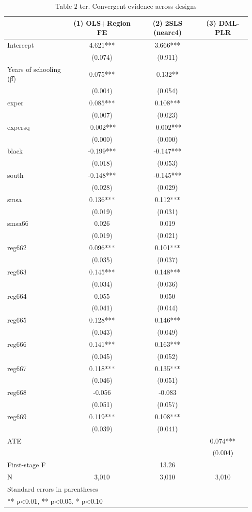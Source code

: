 \begin{table}[htbp]
\centering
\caption{Table 2-ter. Convergent evidence across designs}
\begin{tabular}{lccc}
\hline\hline
 & (1) OLS+Region FE & (2) 2SLS (nearc4) & (3) DML-PLR \\
\hline
Intercept & 4.621*** & 3.666*** &  \\
 & (0.074) & (0.911) &  \\
Years of schooling (β̂) & 0.075*** & 0.132** &  \\
 & (0.004) & (0.054) &  \\
exper & 0.085*** & 0.108*** &  \\
 & (0.007) & (0.023) &  \\
expersq & -0.002*** & -0.002*** &  \\
 & (0.000) & (0.000) &  \\
black & -0.199*** & -0.147*** &  \\
 & (0.018) & (0.053) &  \\
south & -0.148*** & -0.145*** &  \\
 & (0.028) & (0.029) &  \\
smsa & 0.136*** & 0.112*** &  \\
 & (0.019) & (0.031) &  \\
smsa66 & 0.026 & 0.019 &  \\
 & (0.019) & (0.021) &  \\
reg662 & 0.096*** & 0.101*** &  \\
 & (0.035) & (0.037) &  \\
reg663 & 0.145*** & 0.148*** &  \\
 & (0.034) & (0.036) &  \\
reg664 & 0.055 & 0.050 &  \\
 & (0.041) & (0.044) &  \\
reg665 & 0.128*** & 0.146*** &  \\
 & (0.043) & (0.049) &  \\
reg666 & 0.141*** & 0.163*** &  \\
 & (0.045) & (0.052) &  \\
reg667 & 0.118*** & 0.135*** &  \\
 & (0.046) & (0.051) &  \\
reg668 & -0.056 & -0.083 &  \\
 & (0.051) & (0.057) &  \\
reg669 & 0.119*** & 0.108*** &  \\
 & (0.039) & (0.041) &  \\
ATE &  &  & 0.074*** \\
 &  &  & (0.004) \\
\hline
First-stage F &  & 13.26 &  \\
\hline
N & 3,010 & 3,010 & 3,010 \\
\hline\hline
\multicolumn{4}{l}{\footnotesize Standard errors in parentheses} \\
\multicolumn{4}{l}{\footnotesize *** p<0.01, ** p<0.05, * p<0.10} \\
\end{tabular}
\end{table}